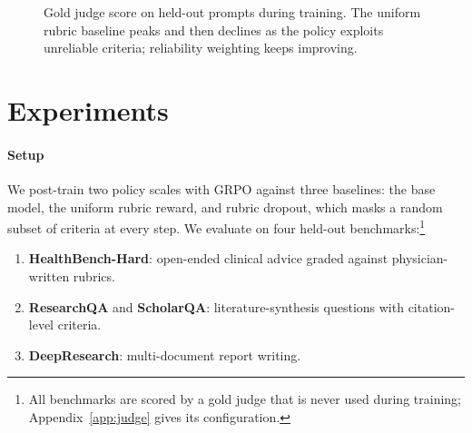 \documentclass[palette=navy,titlestyle=rigorous,titlealign=center]{inkpaper}
\begin{document}
\begin{figure}[t]
\centering
{}
\caption{ Gold judge score on held-out prompts
during training. The uniform rubric baseline peaks and then declines as the
policy exploits unreliable criteria; reliability weighting keeps improving.}
\label{fig:curve}
\end{figure}

\section{Experiments}

\paragraph{Setup} We post-train two policy scales with GRPO against three
baselines: the base model, the uniform rubric reward, and rubric dropout,
which masks a random subset of criteria at every step. We evaluate on four
held-out benchmarks:\footnote{All benchmarks are scored by a gold judge that
is never used during training; Appendix~\ref{app:judge} gives its
configuration.}
\begin{enumerate}
  \item \textbf{HealthBench-Hard}: open-ended clinical advice graded against
    physician-written rubrics.
  \item \textbf{ResearchQA} and \textbf{ScholarQA}: literature-synthesis
    questions with citation-level criteria.
  \item \textbf{DeepResearch}: multi-document report writing.
\end{enumerate}
\end{document}
